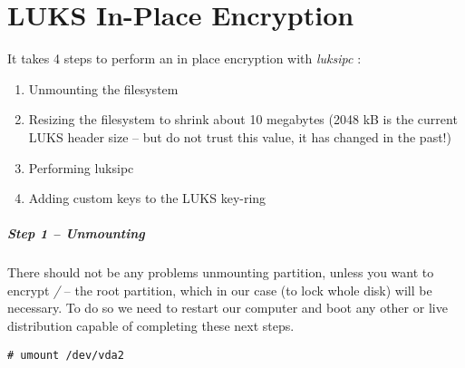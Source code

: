 \chapter{LUKS In-Place Encryption}
\label{luksipc}
It takes 4 steps to perform an in place encryption with {\it luksipc} \cite{luksipc}:
\begin{enumerate}
    \item Unmounting the filesystem
    \item Resizing the filesystem to shrink about 10 megabytes (2048 kB is the current LUKS header size -- but do not trust this value, it has changed in the past!)
    \item Performing luksipc
    \item Adding custom keys to the LUKS key-ring
\end{enumerate}



\paragraph{Step 1 -- Unmounting}
There should not be any problems unmounting partition, unless you want to encrypt {\it /} -- the root partition, which in our case (to lock whole disk) will be necessary.
To do so we need to restart our computer and boot any other or live distribution capable of completing these next steps.
\begin{lstlisting}[columns=fixed,basicstyle=\ttfamily\footnotesize,tabsize=4,backgroundcolor=\color{yellow!10}]
# umount /dev/vda2
\end{lstlisting}



